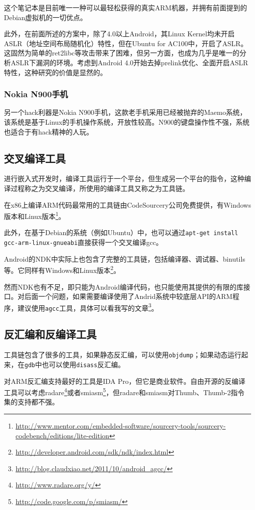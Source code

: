 这个笔记本是目前唯一一种可以最轻松获得的真实ARM机器，并拥有前面提到的Debian虚拟机的一切优点。

此外，在前面所述的方案中，除了4.0以上Android，其Linux Kernel均未开启ASLR（地址空间布局随机化）特性，但在Ubuntu for AC100中，开启了ASLR。这固然为简单的ret2libc等攻击带来了困难，但另一方面，也成为几乎是唯一的分析ASLR下漏洞的环境。考虑到Android 4.0开始去掉prelink优化、全面开启ASLR特性\cite{aslr_android}，这种研究的价值是显然的。

\subsubsection{Nokia N900手机}
另一个hack利器是Nokia N900手机，这款老手机采用已经被抛弃的Maemo系统，该系统是基于Linux的手机操作系统，开放性较高。N900的键盘操作性不强，系统也适合于有hack精神的人玩。
\subsection{交叉编译工具}
进行嵌入式开发时，编译工具运行于一个平台，但生成另一个平台的指令，这种编译过程称之为交叉编译，所使用的编译工具又称之为工具链。

在x86上编译ARM代码最常用的工具链由CodeSourcery公司免费提供，有Windows版本和Linux版本\footnote{\url{http://www.mentor.com/embedded-software/sourcery-tools/sourcery-codebench/editions/lite-edition}}。

此外，在基于Debian的系统（例如Ubuntu）中，也可以通过\lstinline!apt-get install gcc-arm-linux-gnueabi!直接获得一个交叉编译gcc。

Android的NDK中实际上也包含了完整的工具链，包括编译器、调试器、binutils等。它同样有Windows和Linux版本\footnote{\url{http://developer.android.com/sdk/ndk/index.html}}。

然而NDK也有不足，即只能为Android编译代码，也只能使用其提供的有限的库接口。对后面一个问题，如果需要编译使用了Andrid系统中较底层API的ARM程序，建议使用\lstinline!agcc!工具，具体可以看我写的文章\footnote{\url{http://blog.claudxiao.net/2011/10/android\_agcc/}}。
\subsection{反汇编和反编译工具}
工具链包含了很多的工具，如果静态反汇编，可以使用\lstinline!objdump!；如果动态运行起来，在\lstinline!gdb!中也可以使用\lstinline!disass!反汇编。

对ARM反汇编支持最好的工具是IDA Pro，但它是商业软件。自由开源的反编译工具可以考虑radare\footnote{\url{http://www.radare.org/y/}}或者smiasm\footnote{\url{http://code.google.com/p/smiasm/}}，但radare和smiasm对Thumb、Thumb-2指令集的支持都不强。

